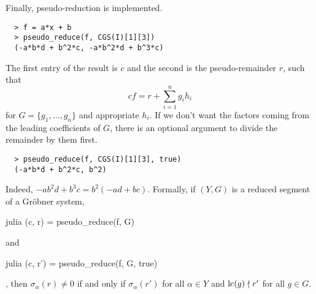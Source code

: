 Finally, pseudo-reduction is implemented.
\begin{verbatim}
  > f = a*x + b
  > pseudo_reduce(f, CGS(I)[1][3])
  (-a*b*d + b^2*c, -a*b^2*d + b^3*c)
\end{verbatim}
The first entry of the result is $c$ and the second is the pseudo-remainder $r$, such that
\[c f = r + \sum_{i=1}^{n} g_{i} h_{i}\]
for $G = \{g_{1}, \dots, g_{n}\}$ and appropriate $h_{i}$. If we don't want the factors coming from the leading coefficients of $G$, there is an optional argument to divide the remainder by them first.
\begin{verbatim}
  > pseudo_reduce(f, CGS(I)[1][3], true)
  (-a*b*d + b^2*c, b^2)
\end{verbatim}
Indeed, $-a b^2 d + b^3 c = b^{2}(-ad + bc)$. Formally, if $(Y, G)$ is a reduced segment of a Gröbner system, \begin{mintinline}{julia} (c, r) = pseudo\_reduce(f, G) \end{mintinline} and \begin{mintinline}{julia} (c, r') = pseudo\_reduce(f, G, true) \end{mintinline}, then $\sigma_{\alpha}(r) \neq 0$ if and only if $\sigma_{\alpha}(r')$ for all $\alpha \in Y$ and $\operatorname{lc}(g) \nmid r'$ for all $g \in G$.

